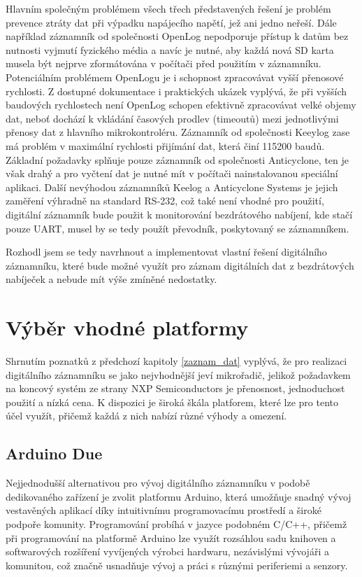 Hlavním společným problémem všech třech představených řešení je problém prevence ztráty dat při výpadku napájecího napětí, jež ani jedno neřeší. Dále například záznamník od společnosti OpenLog nepodporuje přístup k datům bez nutnosti vyjmutí fyzického média a navíc je nutné, aby každá nová SD karta musela být nejprve zformátována v počítači před použitím v záznamníku. Potenciálním problémem OpenLogu je i schopnost zpracovávat vyšší přenosové rychlosti. Z dostupné dokumentace i praktických ukázek vyplývá, že při vyšších baudových rychlostech není OpenLog schopen efektivně zpracovávat velké objemy dat, neboť dochází k vkládání časových prodlev (timeoutů) mezi jednotlivými přenosy dat z hlavního mikrokontroléru. Záznamník od společnosti Keeylog zase má problém v maximální rychlosti přijímání dat, která činí 115200 baudů. Základní požadavky splňuje pouze záznamník od společnosti Anticyclone, ten je však drahý a pro vyčtení dat je nutné mít v počítači nainstalovanou speciální aplikaci. Další nevýhodou záznamníků Keelog a Anticyclone Systems je jejich zaměření výhradně na standard RS-232, což také není vhodné pro použití, digitální záznamník bude použit k monitorování bezdrátového nabíjení, kde stačí pouze UART, musel by se tedy použít převodník, poskytovaný se záznamníkem.

Rozhodl jsem se tedy navrhnout a implementovat vlastní řešení digitálního záznamníku, které bude možné využít pro záznam digitálních dat z bezdrátových nabíječek a nebude mít výše zmíněné nedostatky.

\section{Výběr vhodné platformy}
\label{vyber_vhodne_platformy}
Shrnutím poznatků z předchozí kapitoly \ref{zaznam_dat} vyplývá, že pro realizaci digitálního záznamníku se jako nejvhodnější jeví mikrořadič, jelikož požadavkem na koncový systém ze strany NXP Semiconductors je přenosnost, jednoduchost použití a nízká cena. K dispozici je široká škála platforem, které lze pro tento účel využít, přičemž každá z nich nabízí různé výhody a omezení.


\subsection{Arduino Due}
Nejjednodušší alternativou pro vývoj digitálního záznamníku v podobě dedikovaného zařízení je zvolit platformu Arduino, která umožňuje snadný vývoj vestavěných aplikací díky intuitivnímu programovacímu prostředí a široké podpoře komunity. Programování probíhá v jazyce podobném C/C++, přičemž při programování na platformě Arduino lze využít rozsáhlou sadu knihoven a softwarových rozšíření vyvíjených výrobci hardwaru, nezávislými vývojáři a komunitou, což značně usnadňuje vývoj a práci s různými periferiemi a senzory.


